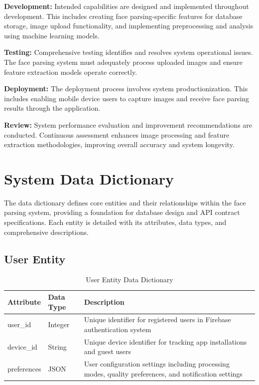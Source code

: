 \documentclass[12pt,a4paper]{report}
\begin{document}
\textbf{Development:} Intended capabilities are designed and implemented throughout development. This includes creating face parsing-specific features for database storage, image upload functionality, and implementing preprocessing and analysis using machine learning models.

\textbf{Testing:} Comprehensive testing identifies and resolves system operational issues. The face parsing system must adequately process uploaded images and ensure feature extraction models operate correctly.

\textbf{Deployment:} The deployment process involves system productionization. This includes enabling mobile device users to capture images and receive face parsing results through the application.

\textbf{Review:} System performance evaluation and improvement recommendations are conducted. Continuous assessment enhances image processing and feature extraction methodologies, improving overall accuracy and system longevity.

\section{System Data Dictionary}

The data dictionary defines core entities and their relationships within the face parsing system, providing a foundation for database design and API contract specifications. Each entity is detailed with its attributes, data types, and comprehensive descriptions.

\subsection{User Entity}

\begin{table}[H]
\centering
\caption{User Entity Data Dictionary}
\label{tab:user_entity}
\begin{tabular}{|p{3cm}|p{2.5cm}|p{6.5cm}|}
\hline
\textbf{Attribute} & \textbf{Data Type} & \textbf{Description} \\
\hline
user\_id & Integer & Unique identifier for registered users in Firebase authentication system \\
\hline
device\_id & String & Unique device identifier for tracking app installations and guest users \\
\hline
preferences & JSON & User configuration settings including processing modes, quality preferences, and notification settings \\
\hline
\end{tabular}
\end{table}
\end{document}
